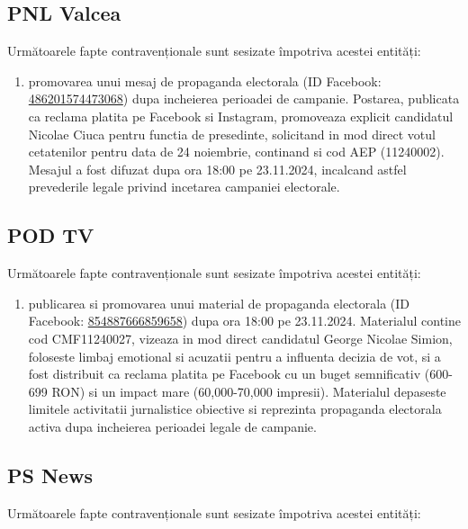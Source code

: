\documentclass[a4paper,12pt]{article}
\begin{document}
\vspace{0.5cm}

\subsection{PNL Valcea}
Următoarele fapte contravenționale sunt sesizate împotriva acestei entități:

\begin{enumerate}[leftmargin=*, label=\arabic*.)]
    \item promovarea unui mesaj de propaganda electorala (ID Facebook: \href{https://www.facebook.com/ads/library/?id=486201574473068}{486201574473068}) dupa incheierea perioadei de campanie. Postarea, publicata ca reclama platita pe Facebook si Instagram, promoveaza explicit candidatul Nicolae Ciuca pentru functia de presedinte, solicitand in mod direct votul cetatenilor pentru data de 24 noiembrie, continand si cod AEP (11240002). Mesajul a fost difuzat dupa ora 18:00 pe 23.11.2024, incalcand astfel prevederile legale privind incetarea campaniei electorale.
\end{enumerate}

\vspace{0.5cm}

\subsection{POD TV}
Următoarele fapte contravenționale sunt sesizate împotriva acestei entități:

\begin{enumerate}[leftmargin=*, label=\arabic*.)]
    \item publicarea si promovarea unui material de propaganda electorala (ID Facebook: \href{https://www.facebook.com/ads/library/?id=854887666859658}{854887666859658}) dupa ora 18:00 pe 23.11.2024. Materialul contine cod CMF11240027, vizeaza in mod direct candidatul George Nicolae Simion, foloseste limbaj emotional si acuzatii pentru a influenta decizia de vot, si a fost distribuit ca reclama platita pe Facebook cu un buget semnificativ (600-699 RON) si un impact mare (60,000-70,000 impresii). Materialul depaseste limitele activitatii jurnalistice obiective si reprezinta propaganda electorala activa dupa incheierea perioadei legale de campanie.
\end{enumerate}

\vspace{0.5cm}

\subsection{PS News}
Următoarele fapte contravenționale sunt sesizate împotriva acestei entități:
\end{document}
